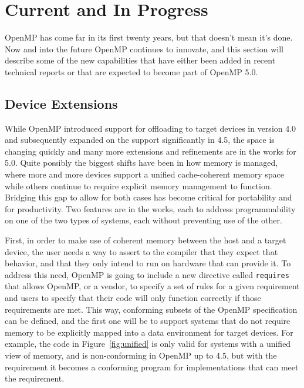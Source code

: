 \section{Current and In Progress}
\label{sec:in_progress}

OpenMP has come far in its first twenty years, but that doesn't mean it's done.
Now and into the future OpenMP continues to innovate, and this section will
describe some of the new capabilities that have either been added in recent
technical reports or that are expected to become part of OpenMP 5.0.

\subsection{Device Extensions}
\label{sub:device_extensions}

While OpenMP introduced support for offloading to target devices in version 4.0
and subsequently expanded on the support significantly in 4.5, the space is
changing quickly and many more extensions and refinements are in the works for
5.0.  Quite possibly the biggest shifts have been in how memory is managed,
where more and more devices support a unified cache-coherent memory space
while others continue to require explicit memory management to function.
Bridging this gap to allow for both cases has become critical for portability
and for productivity.  Two features are in the works, each to address
programmability on one of the two types of systems, each without preventing use
of the other.

First, in order to make use of coherent memory between the host and a target
device, the user needs a way to assert to the compiler that they expect that
behavior, and that they only intend to run on hardware that can provide it.  To
address this need, OpenMP is going to include a new directive called
\texttt{requires} that allows OpenMP, or a vendor, to specify a set of rules for
a given requirement and users to specify that their code will only function
correctly if those requirements are met.  This way, conforming subsets of the
OpenMP specification can be defined, and the first one will be to support
systems that do not require memory to be explicitly mapped into a data
environment for target devices.  For example, the code in
Figure~\ref{fig:unified} is only valid for systems with a unified view of
memory, and is non-conforming in OpenMP up to 4.5, but with the requirement it
becomes a conforming program for implementations that can meet the requirement.

